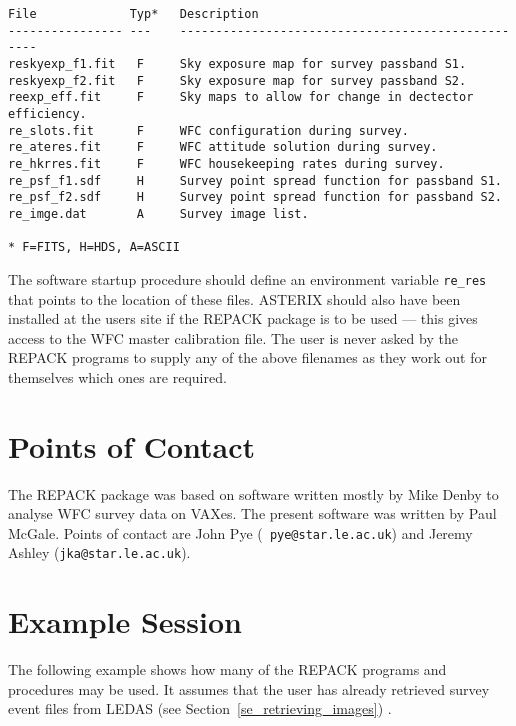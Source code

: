 \begin{verbatim}
File             Typ*   Description
---------------- ---    --------------------------------------------------
reskyexp_f1.fit   F     Sky exposure map for survey passband S1.
reskyexp_f2.fit   F     Sky exposure map for survey passband S2.
reexp_eff.fit     F     Sky maps to allow for change in dectector efficiency.
re_slots.fit      F     WFC configuration during survey.
re_ateres.fit     F     WFC attitude solution during survey.
re_hkrres.fit     F     WFC housekeeping rates during survey.
re_psf_f1.sdf     H     Survey point spread function for passband S1.
re_psf_f2.sdf     H     Survey point spread function for passband S2.
re_imge.dat       A     Survey image list.

* F=FITS, H=HDS, A=ASCII
\end{verbatim}

The software startup procedure should define an environment variable
{\tt re\_res} that points to the location of these files.  ASTERIX
should also have been installed at the users site if the REPACK package
is to be used --- this gives access to the \ro WFC master calibration
file.  The user is never asked by the REPACK programs to supply any of
the above filenames as they work out for themselves which ones are
required.

\section{\label{se_contact_points}Points of Contact}

The REPACK package was based on software written mostly by Mike Denby
to analyse \ro WFC survey data on VAXes.  The present software was
written by Paul McGale.  Points of contact are John Pye ({\tt
pye@star.le.ac.uk}) and Jeremy Ashley ({\tt jka@star.le.ac.uk}).

\newpage

\section{\label{se_example_session}Example Session}

The following example shows how many of the REPACK programs and
procedures may be used.  It assumes that the user has already retrieved
survey event files from LEDAS (see Section~\ref{se_retrieving_images}) .

